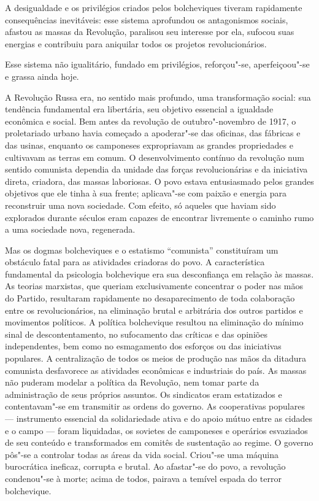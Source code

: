 A desigualdade e os privilégios criados pelos bolcheviques tiveram
rapidamente consequências inevitáveis: esse sistema aprofundou os
antagonismos sociais, afastou as massas da Revolução, paralisou seu
interesse por ela, sufocou suas energias e contribuiu para aniquilar
todos os projetos revolucionários.

Esse sistema não igualitário, fundado em privilégios, reforçou"-se,
aperfeiçoou"-se e grassa ainda hoje.

A Revolução Russa era, no sentido mais profundo, uma transformação
social: sua tendência fundamental era libertária, seu objetivo
essencial a igualdade econômica e social. Bem antes da revolução de
outubro"-novembro de 1917, o proletariado urbano havia começado a
apoderar"-se das oficinas, das fábricas e das usinas, enquanto os
camponeses expropriavam as grandes propriedades e cultivavam as terras
em comum. O desenvolvimento contínuo da revolução num sentido comunista
dependia da unidade das forças revolucionárias e da iniciativa direta,
criadora, das massas laboriosas. O povo estava entusiasmado pelos
grandes objetivos que ele tinha à sua frente; aplicava"-se com paixão e
energia para reconstruir uma nova sociedade. Com efeito, só aqueles
que haviam sido explorados durante séculos eram capazes de encontrar
livremente o caminho rumo a uma sociedade nova, regenerada.

Mas os dogmas bolcheviques e o estatismo “comunista” constituíram um
obstáculo fatal para as atividades criadoras do povo. A característica
fundamental da psicologia bolchevique era sua desconfiança em relação
às massas. As teorias marxistas, que queriam exclusivamente concentrar
o poder nas mãos do Partido, resultaram rapidamente no desaparecimento
de toda colaboração entre os revolucionários, na eliminação brutal e
arbitrária dos outros partidos e movimentos políticos. A política
bolchevique resultou na eliminação do mínimo sinal de descontentamento,
no sufocamento das críticas e das opiniões independentes, bem como no
esmagamento dos esforços ou das iniciativas populares. A centralização
de todos os meios de produção nas mãos da ditadura comunista
desfavorece as atividades econômicas e industriais do país. As massas
não puderam modelar a política da Revolução, nem tomar parte da
administração de seus próprios assuntos. Os sindicatos eram
estatizados e contentavam"-se em transmitir as ordens do governo. As
cooperativas populares --- instrumento essencial da solidariedade ativa e
do apoio mútuo entre as cidades e o campo --- foram liquidadas, os sovietes de
camponeses e operários esvaziados de seu conteúdo e transformados em
comitês de sustentação ao regime. O governo pôs"-se a controlar todas
as áreas da vida social. Criou"-se uma máquina burocrática ineficaz,
corrupta e brutal. Ao afastar"-se do povo, a revolução condenou"-se à
morte; acima de todos, pairava a temível espada do terror bolchevique.

